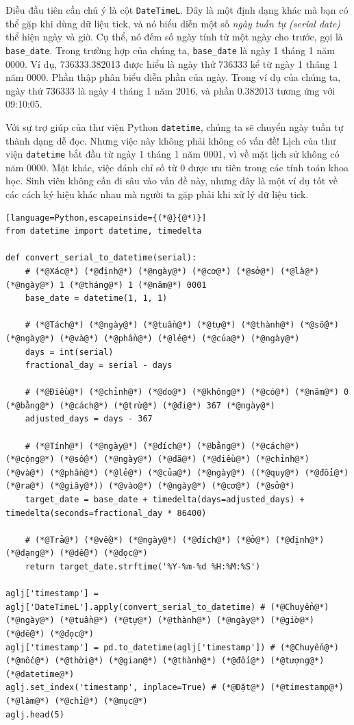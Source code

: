 Điều đầu tiên cần chú ý là cột \texttt{DateTimeL}. Đây là một định dạng khác mà bạn có thể gặp khi dùng dữ liệu tick, và nó biểu diễn một số \emph{ngày tuần tự (serial date)} thể hiện ngày và giờ. Cụ thể, nó đếm số ngày tính từ một ngày cho trước, gọi là \texttt{base\_date}. Trong trường hợp của chúng ta, \texttt{base\_date} là ngày 1 tháng 1 năm 0000. Ví dụ, 736333.382013 được hiểu là ngày thứ 736333 kể từ ngày 1 tháng 1 năm 0000. Phần thập phân biểu diễn phần của ngày. Trong ví dụ của chúng ta, ngày thứ 736333 là ngày 4 tháng 1 năm 2016, và phần 0.382013 tương ứng với 09:10:05.

Với sự trợ giúp của thư viện Python \texttt{datetime}, chúng ta sẽ chuyển ngày tuần tự thành dạng dễ đọc. Nhưng việc này không phải không có vấn đề! Lịch của thư viện \texttt{datetime} bắt đầu từ ngày 1 tháng 1 năm 0001, vì về mặt lịch sử không có năm 0000. Mặt khác, việc đánh chỉ số từ 0 được ưu tiên trong các tính toán khoa học. Sinh viên không cần đi sâu vào vấn đề này, nhưng đây là một ví dụ tốt về các cách ký hiệu khác nhau mà người ta gặp phải khi xử lý dữ liệu tick.

\begin{lstlisting}[language=Python,escapeinside={(*@}{@*)}]
from datetime import datetime, timedelta

def convert_serial_to_datetime(serial):
    # (*@Xác@*) (*@định@*) (*@ngày@*) (*@cơ@*) (*@sở@*) (*@là@*) (*@ngày@*) 1 (*@tháng@*) 1 (*@năm@*) 0001
    base_date = datetime(1, 1, 1)

    # (*@Tách@*) (*@ngày@*) (*@tuần@*) (*@tự@*) (*@thành@*) (*@số@*) (*@ngày@*) (*@và@*) (*@phần@*) (*@lẻ@*) (*@của@*) (*@ngày@*)
    days = int(serial)
    fractional_day = serial - days

    # (*@Điều@*) (*@chỉnh@*) (*@do@*) (*@không@*) (*@có@*) (*@năm@*) 0 (*@bằng@*) (*@cách@*) (*@trừ@*) (*@đi@*) 367 (*@ngày@*)
    adjusted_days = days - 367

    # (*@Tính@*) (*@ngày@*) (*@đích@*) (*@bằng@*) (*@cách@*) (*@cộng@*) (*@số@*) (*@ngày@*) (*@đã@*) (*@điều@*) (*@chỉnh@*) (*@và@*) (*@phần@*) (*@lẻ@*) (*@của@*) (*@ngày@*) ((*@quy@*) (*@đổi@*) (*@ra@*) (*@giây@*)) (*@vào@*) (*@ngày@*) (*@cơ@*) (*@sở@*)
    target_date = base_date + timedelta(days=adjusted_days) + timedelta(seconds=fractional_day * 86400)

    # (*@Trả@*) (*@về@*) (*@ngày@*) (*@đích@*) (*@ở@*) (*@định@*) (*@dạng@*) (*@dễ@*) (*@đọc@*)
    return target_date.strftime('%Y-%m-%d %H:%M:%S')

aglj['timestamp'] = aglj['DateTimeL'].apply(convert_serial_to_datetime) # (*@Chuyển@*) (*@ngày@*) (*@tuần@*) (*@tự@*) (*@thành@*) (*@ngày@*) (*@giờ@*) (*@dễ@*) (*@đọc@*)
aglj['timestamp'] = pd.to_datetime(aglj['timestamp']) # (*@Chuyển@*) (*@mốc@*) (*@thời@*) (*@gian@*) (*@thành@*) (*@đối@*) (*@tượng@*) (*@datetime@*)
aglj.set_index('timestamp', inplace=True) # (*@Đặt@*) (*@timestamp@*) (*@làm@*) (*@chỉ@*) (*@mục@*)
aglj.head(5)
\end{lstlisting}

